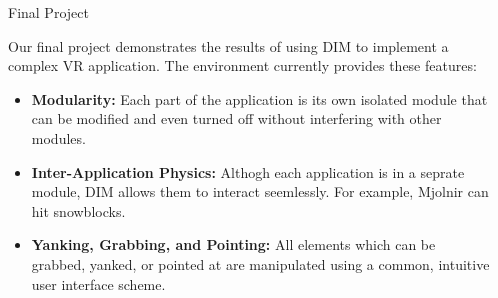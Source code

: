 \documentclass[final]{beamer}
\newlength{\sepwid}
\newlength{\onecolwid}
\begin{document}
\begin{frame}[t]
\begin{columns}[t]
            \begin{column}{\sepwid}\end{column} %

            \begin{column}{\onecolwid} %

                \begin{block}{Final Project}
                    \setlength{\parskip}{0.5em}

                    Our final project demonstrates the results of using DIM to
                    implement a complex VR application. The environment
                    currently provides these features:
                    \begin{itemize}

                        \item \textbf{Modularity:} Each part of the application
                            is its own isolated module that can be modified and
                            even turned off without interfering with other
                            modules.

                        \item \textbf{Inter-Application Physics:} Althogh each
                            application is in a seprate module, DIM allows them
                            to interact seemlessly. For example, Mjolnir can hit
                            snowblocks.

                        \item \textbf{Yanking, Grabbing, and Pointing:} All
                            elements which can be grabbed, yanked, or pointed at
                            are manipulated using a common, intuitive user
                            interface scheme.

                    \end{itemize}

                \end{block}

            \end{column} %

        \end{columns} %

    \end{frame} %
\end{document}
